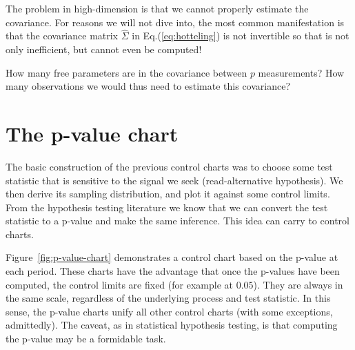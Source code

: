 The problem in high-dimension is that we cannot properly estimate the covariance. 
For reasons we will not dive into, the most common manifestation is that the covariance matrix $\hat{\Sigma}$ in Eq.(\ref{eq:hotteling}) is not invertible so that \tsq is not only inefficient, but  cannot even be computed!

\begin{think}
How many free parameters are in the covariance between $p$ measurements?
How many observations we would thus need to estimate this covariance?
\end{think} 






\section{The p-value chart}
The basic construction of the previous control charts was to choose some test statistic that is sensitive to the signal  we seek (read-alternative hypothesis). We then derive its sampling distribution, and plot it against some control limits. 
From the hypothesis testing literature we know that we can convert the test statistic to a p-value and make the same inference. 
This idea can carry to control charts.

Figure~\ref{fig:p-value-chart} demonstrates a control chart based on the p-value at each period.
These charts have the advantage that once the p-values have been computed, the control limits are fixed (for example at $0.05$).
They are always in the same scale, regardless of the underlying process and test statistic. 
In this sense, the p-value charts unify all other control charts (with some exceptions, admittedly). 
The caveat, as in statistical hypothesis testing, is that computing the p-value may be a formidable task. 

